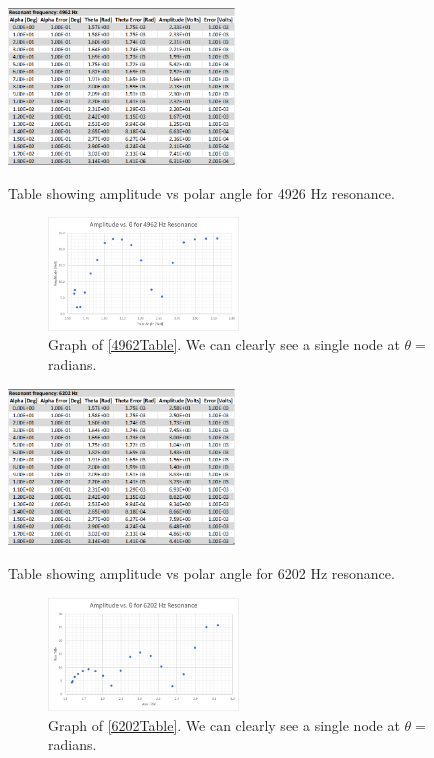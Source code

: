 \documentclass[12pt]{article}
\begin{document}
	\begin{multicols}{2}	
		\begin{table}[H]
			\includegraphics[width=0.45\textwidth]{Tables/4962Table.png}
			\caption{Table showing amplitude vs polar angle for 4926 Hz resonance.}
			\label{4962Table}		
		\end{table}
	\columnbreak
		\begin{figure}[H]
			\includegraphics[width=0.45\textwidth]{Graphs/4962Graph.png}
			\caption{Graph of \cref{4962Table}. We can clearly see a single node at $\theta = $ radians.}
			\label{4962Graph}
		\end{figure}
	\end{multicols}


	\begin{multicols}{2}	
		\begin{table}[H]
			\includegraphics[width=0.45\textwidth]{Tables/6202Table.png}
			\caption{Table showing amplitude vs polar angle for 6202 Hz resonance.}
			\label{6202Table}		
		\end{table}
	\columnbreak
		\begin{figure}[H]
			\includegraphics[width=0.45\textwidth]{Graphs/6202Graph.png}
			\caption{Graph of \cref{6202Table}. We can clearly see a single node at $\theta = $ radians.}
			\label{6202Graph}
		\end{figure}
	\end{multicols}
\end{document}
